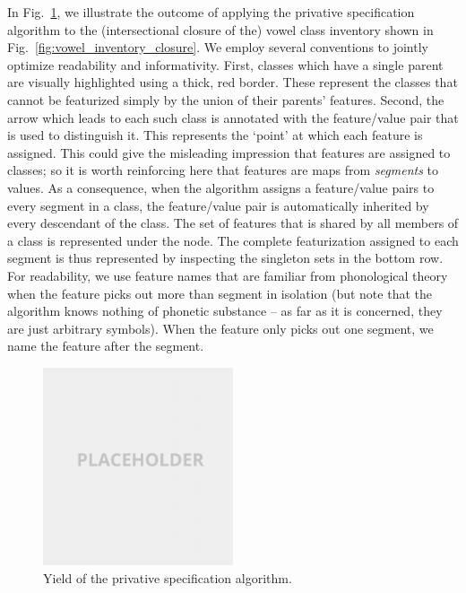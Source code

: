 \documentclass[11pt, oneside]{article}   	%
\begin{document}
\vspace{\baselineskip} In Fig.~\ref{fig:privative}, we illustrate the outcome of applying the privative specification algorithm to the (intersectional closure of the) vowel class inventory shown in Fig.~\ref{fig:vowel_inventory_closure}. We employ several conventions to jointly optimize readability and informativity. First, classes which have a single parent are visually highlighted using a thick, red border. These represent the classes that cannot be featurized simply by the union of their parents' features. Second, the arrow which leads to each such class is annotated with the feature/value pair that is used to distinguish it. This represents the `point' at which each feature is assigned. This could give the misleading impression that features are assigned to classes; so it is worth reinforcing here that features are maps from \textit{segments} to values. As a consequence, when the algorithm assigns a feature/value pairs to every segment in a class, the feature/value pair is automatically inherited by every descendant of the class. The set of features that is shared by all members of a class is represented under the node. The complete featurization assigned to each segment is thus represented by inspecting the singleton sets in the bottom row. For readability, we use feature names that are familiar from phonological theory when the feature picks out more than segment in isolation (but note that the algorithm knows nothing of phonetic substance -- as far as it is concerned, they are just arbitrary symbols). When the feature only picks out one segment, we name the feature after the segment.

\begin{figure}[h]
  \centering
  \includegraphics[width=0.5\textwidth]{placeholder.png}
  \caption{Yield of the privative specification algorithm.}
  \label{fig:privative}
\end{figure}
\end{document}
